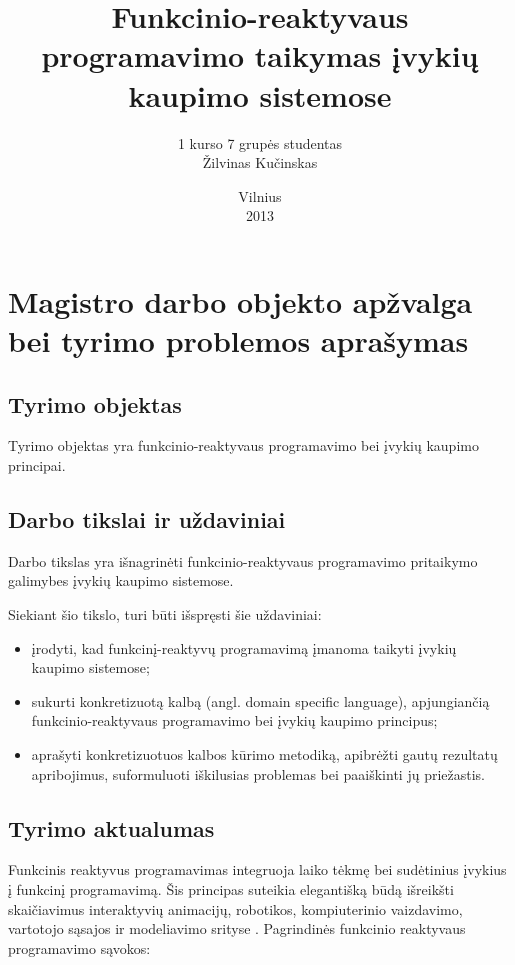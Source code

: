 \documentclass[12pt, a4paper, lithuanian]{article}
\title{Funkcinio-reaktyvaus programavimo taikymas įvykių kaupimo sistemose}
\author{
    1 kurso 7 grupės studentas \\
    Žilvinas Kučinskas
}
\date{Vilnius \\ 2013}
\begin{document}
\maketitle

\tableofcontents

\section{Magistro darbo objekto apžvalga bei tyrimo problemos aprašymas}

\subsection{Tyrimo objektas}

    Tyrimo objektas yra funkcinio-reaktyvaus programavimo bei įvykių kaupimo principai.

\subsection{Darbo tikslai ir uždaviniai}

    Darbo tikslas yra išnagrinėti funkcinio-reaktyvaus programavimo pritaikymo galimybes įvykių kaupimo sistemose.

    Siekiant šio tikslo, turi būti išspręsti šie uždaviniai:

\begin{itemize}
        \item įrodyti, kad funkcinį-reaktyvų programavimą įmanoma taikyti įvykių
            kaupimo sistemose;
        \item sukurti konkretizuotą kalbą (angl. domain specific language), apjungiančią funkcinio-reaktyvaus programavimo
            bei įvykių kaupimo principus;
        \item aprašyti konkretizuotuos kalbos kūrimo metodiką, apibrėžti gautų rezultatų apribojimus, suformuluoti iškilusias problemas bei paaiškinti jų priežastis.
\end{itemize}

\subsection{Tyrimo aktualumas}

    Funkcinis reaktyvus programavimas integruoja laiko tėkmę bei sudėtinius įvykius į funkcinį programavimą. Šis principas suteikia elegantišką būdą išreikšti skaičiavimus interaktyvių animacijų, robotikos, kompiuterinio vaizdavimo, vartotojo sąsajos ir modeliavimo srityse \cite[p. 4]{ELM:FRP}. Pagrindinės funkcinio reaktyvaus programavimo sąvokos:
\end{document}
